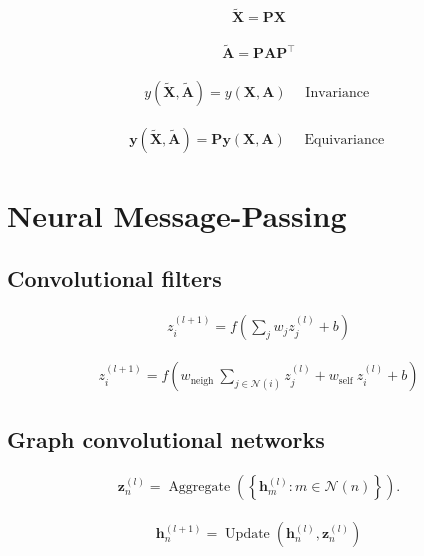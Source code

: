 \documentclass{article}
\begin{document}
\begin{align*}
\widetilde{\mathbf{X}}=\mathbf{P X}
\tag{13.4}
\end{align*}

\begin{align*}
\widetilde{\mathbf{A}}=\mathbf{P A P}^{\top}
\tag{13.5}
\end{align*}

\begin{align*}
y(\widetilde{\mathbf{X}}, \widetilde{\mathbf{A}})=y(\mathbf{X}, \mathbf{A}) \quad \text{ Invariance } 
\tag{13.6}
\end{align*}

\begin{align*}
\mathbf{y}(\widetilde{\mathbf{X}}, \widetilde{\mathbf{A}})=\mathbf{P y}(\mathbf{X}, \mathbf{A}) \quad \text{ Equivariance }
\tag{13.7}
\end{align*}

\section{Neural Message-Passing}

\subsection{Convolutional filters}
\begin{align*}
z_{i}^{(l+1)}=f\left(\sum_{j} w_{j} z_{j}^{(l)}+b\right) \tag{13.8}
\end{align*}

\begin{align*}
z_{i}^{(l+1)}=f\left(w_{\text{neigh }} \sum_{j \in \mathcal{N}(i)} z_{j}^{(l)}+w_{\text{self }} z_{i}^{(l)}+b\right) \tag{13.9}
\end{align*}

\subsection{Graph convolutional networks}
\begin{align*}
\mathbf{z}_{n}^{(l)}=\operatorname{Aggregate}\left(\left\{\mathbf{h}_{m}^{(l)}: m \in \mathcal{N}(n)\right\}\right) . \tag{13.10}
\end{align*}

\begin{align*}
\mathbf{h}_{n}^{(l+1)}=\operatorname{Update}\left(\mathbf{h}_{n}^{(l)}, \mathbf{z}_{n}^{(l)}\right) \tag{13.11}
\end{align*}
\end{document}
